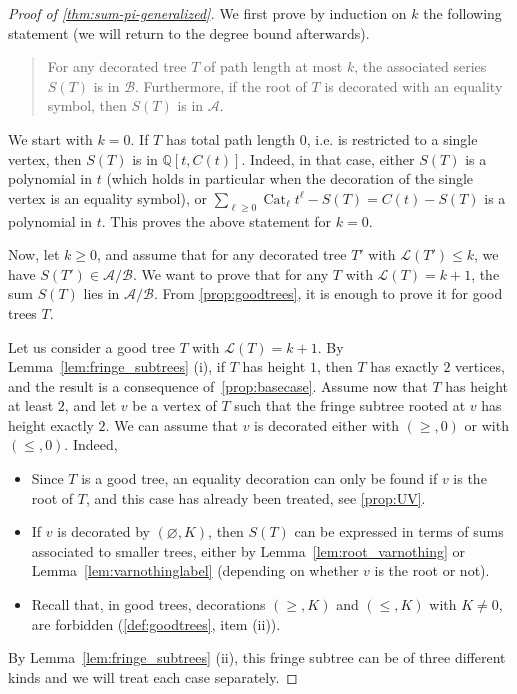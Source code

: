 \documentclass[12pt]{amsart}
\newcommand{\revision}[1]{{#1}}
\theoremstyle{plain}
\theoremstyle{remark}
\def\cL{\mathcal{L}}
\DeclareMathOperator{\Cat}{Cat}
\def\cA{\mathcal{A}}
\def\cB{\mathcal{B}}
\begin{document}
\begin{proof}[Proof of \cref{thm:sum-pi-generalized}]
\revision{We first prove by induction on $k$ the following statement (we will return to the degree bound afterwards).}
\begin{quote}
\revision{For any decorated tree $T$ of path length at most $k$, the associated series $S(T)$ is in $\mathcal B$. Furthermore, if the root of $T$ is decorated with an equality symbol, then $S(T)$ is in $\mathcal A$.}
\end{quote}
\revision{We start with $k=0$.}
If $T$ has total path length $0$, i.e. is restricted to a single vertex, then $S(T)$ is in $\mathbb Q[t,C(t)]$.
Indeed, in that case, either $S(T)$ is a polynomial in $t$ (which holds in particular
when the decoration of the single vertex is an equality symbol),
 or $\sum_{\ell \ge 0} \Cat_{\ell} t^{\ell}  - S(T)=  C(t) - S(T)$ is a polynomial in $t$.
 \revision{This proves the above statement for $k=0$.}
 
 Now, let $k \ge 0$, and assume that for any decorated tree $T'$ with $\cL(T') \le k$,
 we have $S(T') \in \cA/\cB$. 
 We want to prove that for any $T$ with $\cL(T) = k+1$,
 the sum $S(T)$ lies in $\cA/\cB$. 
 From \cref{prop:goodtrees}, it is enough to prove it for good trees $T$.
  
 Let us consider a good tree $T$ with $\cL(T) = k+1$.
By Lemma~\ref{lem:fringe_subtrees} (i),
if $T$ has height $1$, then $T$ has exactly $2$ vertices, 
and the result is a consequence of~\cref{prop:basecase}.
Assume now that $T$ has height at least $2$,
and let $v$ be a vertex of $T$ such that the fringe subtree rooted at $v$ has height exactly $2$.
We can assume that $v$ is decorated either
 with $(\ge,0)$ or with $(\le,0)$. Indeed,
 \begin{itemize}
 \item Since $T$ is a good tree, an equality decoration can only be found if $v$ is the root of $T$, and this case has already been treated, see \cref{prop:UV}.
 \item If $v$ is decorated by $(\varnothing,K)$, then $S(T)$ can be expressed
 in terms of sums associated to smaller trees, either by Lemma~\ref{lem:root_varnothing} or Lemma~\ref{lem:varnothinglabel} 
(depending on whether $v$ is the root or not).
\item Recall that, in good trees, decorations $(\ge,K)$ and $(\le,K)$ with $K \ne 0$,
are forbidden (\cref{def:goodtrees}, item (ii)).
 \end{itemize}
By  Lemma~\ref{lem:fringe_subtrees} (ii), this fringe subtree can be of three different kinds
and we will treat each case separately.
\smallskip


\end{proof}
\end{document}
